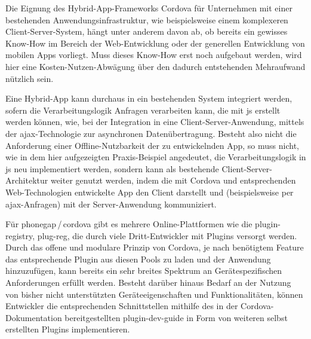 

Die Eignung des Hybrid-App-Frameworks Cordova für Unternehmen mit einer bestehenden Anwendungsinfrastruktur, wie beispielsweise einem komplexeren Client-Server-System, hängt unter anderem davon ab, ob bereits ein gewisses Know-How im Bereich der Web-Entwicklung oder der generellen Entwicklung von mobilen Apps vorliegt. 
Muss dieses Know-How erst noch aufgebaut werden, wird hier eine Kosten-Nutzen-Abwägung über den dadurch entstehenden Mehraufwand nützlich sein.


Eine Hybrid-App kann durchaus in ein bestehenden System integriert werden, sofern die Verarbeitungslogik Anfragen verarbeiten kann, die mit \gls{js} erstellt werden können, wie, \zB bei der Integration in eine Client-Server-Anwendung, mittels der \gls{ajax}-Technologie zur asynchronen Datenübertragung.
Besteht also nicht die Anforderung einer Offline-Nutzbarkeit der zu entwickelnden App, so muss nicht, wie in dem hier aufgezeigten Praxis-Beispiel angedeutet, die Verarbeitungslogik in \gls{js} neu implementiert werden, sondern kann als bestehende Client-Server-Architektur weiter genutzt werden, indem die mit Cordova und entsprechenden Web-Technologien entwickelte App den Client darstellt und (beispielsweise per \gls{ajax}-Anfragen) mit der Server-Anwendung kommuniziert.


Für \gls{phonegap}\,/\,\gls{cordova} gibt es mehrere Online-Plattformen wie die \gls{plugin-registry}, \gls{plug-reg}, die durch viele Dritt-Entwickler mit Plugins versorgt werden.
Durch das offene und modulare Prinzip von Cordova, je nach benötigtem Feature das entsprechende Plugin aus diesen Pools zu laden und der Anwendung hinzuzufügen, kann bereits ein sehr breites Spektrum an Gerätespezifischen Anforderungen erfüllt werden.
Besteht darüber hinaus Bedarf an der Nutzung von bisher nicht unterstützten Geräteeigenschaften und Funktionalitäten, können Entwickler die entsprechenden Schnittstellen mithilfe des in der Cordova-Dokumentation bereitgestellten \gls{plugin-dev-guide} in Form von weiteren selbst erstellten Plugins implementieren. 

